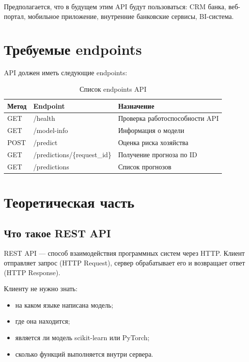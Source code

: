 \documentclass[12pt,a4paper]{article}
\begin{document}
Предполагается, что в будущем этим API будут пользоваться: CRM банка, веб-портал, мобильное приложение, внутренние банковские сервисы, BI-система.

\section{Требуемые endpoints}

API должен иметь следующие endpoints:

\begin{table}[H]
\centering
\caption{Список endpoints API}
\label{tab:endpoints}
\begin{tabular}{|l|l|l|}
\hline
\textbf{Метод} & \textbf{Endpoint} & \textbf{Назначение} \\
\hline
GET  & /health                    & Проверка работоспособности API \\
GET  & /model-info                & Информация о модели \\
POST & /predict                   & Оценка риска хозяйства \\
GET  & /predictions/\{request\_id\} & Получение прогноза по ID \\
GET  & /predictions               & Список прогнозов \\
\hline
\end{tabular}
\end{table}

\section{Теоретическая часть}

\subsection{Что такое REST API}

REST API — способ взаимодействия программных систем через HTTP. Клиент отправляет запрос (HTTP Request), сервер обрабатывает его и возвращает ответ (HTTP Response).


Клиенту не нужно знать:

\begin{itemize}
    \item на каком языке написана модель;
    \item где она находится;
    \item является ли модель scikit-learn или PyTorch;
    \item сколько функций выполняется внутри сервера.
\end{itemize}
\end{document}
